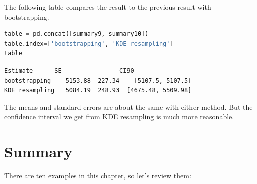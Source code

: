 The following table compares the result to the previous result with
bootstrapping.

\begin{lstlisting}[language=Python,style=source]
table = pd.concat([summary9, summary10])
table.index=['bootstrapping', 'KDE resampling']
table
\end{lstlisting}

\begin{lstlisting}[style=output]
                Estimate      SE                CI90
bootstrapping    5153.88  227.34    [5107.5, 5107.5]
KDE resampling   5084.19  248.93  [4675.48, 5509.98]
\end{lstlisting}

The means and standard errors are about the same with either method. But
the confidence interval we get from KDE resampling is much more
reasonable.

\hypertarget{summary}{%
\section{Summary}\label{summary}}

There are ten examples in this chapter, so let's review them:


